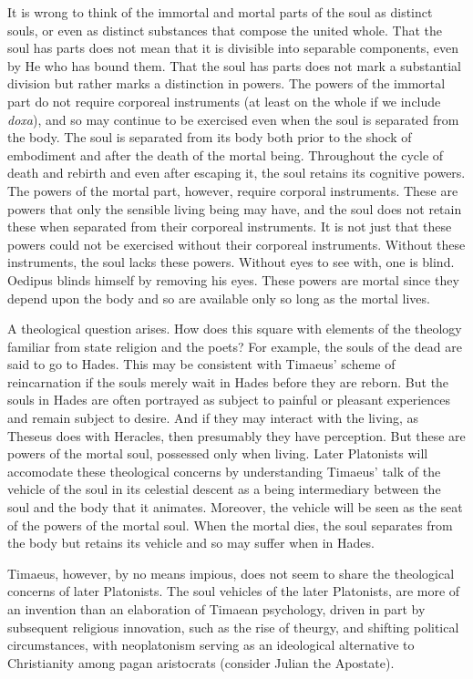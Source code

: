 It is wrong to think of the immortal and mortal parts of the soul as distinct souls, or even as distinct substances that compose the united whole. That the soul has parts does not mean that it is divisible into separable components, even by He who has bound them. That the soul has parts does not mark a substantial division but rather marks a distinction in powers. The powers of the immortal part do not require corporeal instruments (at least on the whole if we include \emph{doxa}), and so may continue to be exercised even when the soul is separated from the body. The soul is separated from its body both prior to the shock of embodiment and after the death of the mortal being. Throughout the cycle of death and rebirth and even after escaping it, the soul retains its cognitive powers. The powers of the mortal part, however, require corporal instruments. These are powers that only the sensible living being may have, and the soul does not retain these when separated from their corporeal instruments. It is not just that these powers could not be exercised without their corporeal instruments. Without these instruments, the soul lacks these powers. Without eyes to see with, one is blind. Oedipus blinds himself by removing his eyes. These powers are mortal since they depend upon the body and so are available only so long as the mortal lives.

A theological question arises. How does this square with elements of the theology familiar from state religion and the poets? For example, the souls of the dead are said to go to Hades. This may be consistent with Timaeus' scheme of reincarnation if the souls merely wait in Hades before they are reborn. But the souls in Hades are often portrayed as subject to painful or pleasant experiences and remain subject to desire. And if they may interact with the living, as Theseus does with Heracles, then presumably they have perception. But these are powers of the mortal soul, possessed only when living. Later Platonists will accomodate these theological concerns by understanding Timaeus' talk of the vehicle of the soul in its celestial descent as a being intermediary between the soul and the body that it animates. Moreover, the vehicle will be seen as the seat of the powers of the mortal soul. When the mortal dies, the soul separates from the body but retains its vehicle and so may suffer when in Hades.

Timaeus, however, by no means impious, does not seem to share the theological concerns of later Platonists. The soul vehicles of the later Platonists, are more of an invention than an elaboration of Timaean psychology, driven in part by subsequent religious innovation, such as the rise of theurgy, and shifting political circumstances, with neoplatonism serving as an ideological alternative to Christianity among pagan aristocrats (consider Julian the Apostate).

